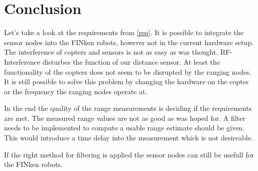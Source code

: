 \section{Conclusion}

Let's take a look at the requirements from \autoref{req}.
It is possible to integrate the sensor nodes into the FINken robots, however not in the current hardware setup.
The interference of copters and sensors is not as easy as was thought.
RF-Interference disturbes the function of our distance sensor.
At least the functionality of the copters does not seem to be disrupted by the ranging nodes.
It is still possible to solve this problem by changing the hardware on the copter or the frequency the ranging nodes operate at.

In the end the quality of the range measurements is deciding if the requirements are met.
The measured range values are not as good as was hoped for.
A filter needs to be implemented to compute a usable range estimate should be given.
This would introduce a time delay into the measurement which is not desireable. 

If the right method for filtering is applied the sensor nodes can still be usefull for the FINken robots.
